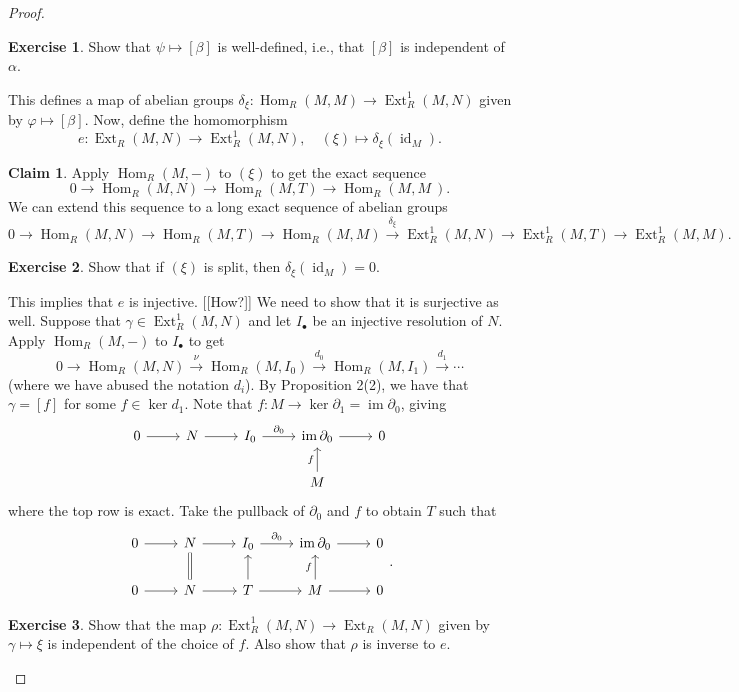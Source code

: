 \documentclass[10pt,letterpaper,cm]{nupset}
\theoremstyle{definition}
\newtheorem{claim}{Claim}
\newtheorem{exercise}{Exercise}
\newcommand{\1}{\mathbf{1}}
\newcommand{\0}{\vec 0}
\DeclareMathOperator{\id}{id}
\DeclareMathOperator{\ext}{Ext}
\DeclareMathOperator{\im}{im}
\DeclareMathOperator{\Hom}{Hom}
\begin{document}
\begin{proof}
\begin{exercise}
Show that $\psi \mapsto [\beta]$ is well-defined, i.e., that $[\beta]$ is independent of $\alpha$. 
\end{exercise} 
This defines a map of abelian groups $\delta_{\xi}: \Hom_R(M, M) \to \ext^1_R(M, N)$ given by $\varphi \mapsto [\beta]$. Now, define the homomorphism $$e: \ext_R(M, N) \to \ext^1_R(M , N), \quad (\xi) \mapsto \delta_{\xi}(\id_M).$$

\begin{claim}  Apply $\Hom_R(M, -)$ to $(\xi)$ to get the exact sequence $$0 \to \Hom_R(M, N) \to \Hom_R(M, T) \to \Hom_R(M, M\
)  . $$   
We can extend this sequence to a long exact sequence of abelian groups $$0 \to \Hom_R(M, N) \to \Hom_R(M, T) \to \Hom_R(M, M)  \overset{\delta_{\xi}}{\longrightarrow} \ext^1_R(M, N) \to \ext^1_R(M, T) \to \ext^1_R(M, M).$$
\end{claim}
\begin{exercise}
Show that if $(\xi)$ is split, then $\delta_{\xi}(\id_M) =0$.
\end{exercise} 
This implies that  $e$ is injective. {[[How?]]} We need to show that it is surjective as well. Suppose that $\gamma \in \ext_R^1(M, N)$ and let $I_{\bullet}$ be an injective resolution of $N$. Apply $\Hom_R(M, -)$ to $I_{\bullet}$ to get $$0 \to \Hom_R(M, N) \overset{\nu}{\longrightarrow} \Hom_R(M, I_0) \overset{d_0}{\longrightarrow} \Hom_R(M, I_1) \overset{d_1}{\longrightarrow} \cdots   $$ (where we have abused the notation $d_i$). 
By Proposition 2(2), we have that $\gamma = [f]$ for some $f\in \ker{d_1}$. Note that $f: M \to \ker{\partial_1} = \im{\partial_0}$, giving 
\[ \begin{tikzcd}
0 \arrow[r] & N \arrow[r] & I_0 \arrow[r, "\partial_0"] & \im{\partial_0} \arrow[r] & 0 \\
 &  &  & M \arrow[u, "f"] & 
\end{tikzcd}
\] where the top row is exact. Take the pullback of $\partial_0$ and $f$ to obtain $T$ such that
\[
\begin{tikzcd}
0 \arrow[r] & N \arrow[r] & I_0 \arrow[r, "\partial_0"] & \im{\partial_0} \arrow[r] & 0 \\
0 \arrow[r] & N \arrow[r] \arrow[u, equal] & T \arrow[r] \arrow[u] & M \arrow[u, "f"] \arrow[r] & 0
\end{tikzcd}
.\]
\begin{exercise}
Show that the map $\rho: \ext_R^1(M, N) \to \ext_R(M, N)$ given by $\gamma \mapsto \xi$ is independent of the choice of $f$. Also show that $\rho$ is inverse to  $e$.
\end{exercise}
\end{proof}
\end{document}
